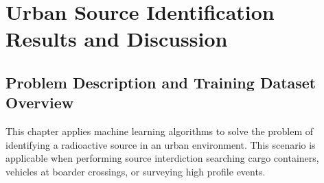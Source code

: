 \chapter{Urban Source Identification Results and Discussion}






\newcommand{\blackline}{\raisebox{2pt}{\tikz{\draw[-,black!40!black,solid,line width = 1.1pt](0,0) -- (6mm,0);}}}

\newcommand{\blackdotline}{\raisebox{2pt}{\tikz{\draw[-,black!40!black,dashed,line width = 1.1pt](0,0) -- (6mm,0);}}}

\newcommand{\blackdashdotline}{\raisebox{2pt}{\tikz{\draw[-,black!40!black,dash dot,line width = 1.1pt](0,0) -- (6mm,0);}}}

\newcommand{\blackdottedline}{\raisebox{2pt}{\tikz{\draw[-,black!40!black,dotted,line width = 1.1pt](0,0) -- (6mm,0);}}}

\section{Problem Description and Training Dataset Overview}

This chapter applies machine learning algorithms to solve the problem of identifying a radioactive source in an urban environment. This scenario is applicable when performing source interdiction searching cargo containers, vehicles at boarder crossings, or surveying high profile events. 






